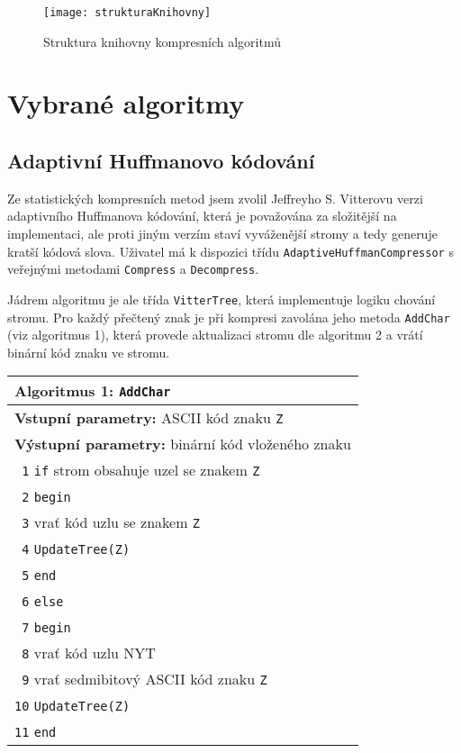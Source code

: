 \begin{figure}[!h]
\centering
\texttt{[image: strukturaKnihovny]}
\caption{Struktura knihovny kompresních algoritmů}
\label{strukturaKnihovny}
\end{figure}


\section{Vybrané algoritmy}
\subsection{Adaptivní Huffmanovo kódování}
Ze statistických kompresních metod jsem zvolil Jeffreyho S. Vitterovu verzi adaptivního Huffmanova kódování, která je považována za složitější na implementaci, ale proti jiným verzím staví vyváženější stromy a tedy generuje kratší kódová slova. Uživatel má k dispozici třídu \texttt{AdaptiveHuffmanCompressor} s veřejnými metodami \texttt{Compress} a \texttt{Decompress}. 

Jádrem algoritmu je ale třída \texttt{VitterTree}, která implementuje logiku chování stromu. Pro každý přečtený znak je při kompresi zavolána jeho metoda \texttt{AddChar} (viz algoritmus 1), která provede aktualizaci stromu dle algoritmu 2 a vrátí binární kód znaku ve stromu.

\begin{table}[!h]
\centering
\begin{tabular}{|l|}
\hline
\textbf{Algoritmus 1:} \texttt{AddChar}\\
\hline
\textbf{Vstupní parametry:} ASCII kód znaku \texttt{Z}\\
\textbf{Výstupní parametry:} binární kód vloženého znaku\\
\hline
\texttt{ 1} \texttt{if} strom obsahuje uzel se znakem \texttt{Z}\\
\texttt{ 2} \texttt{begin}\\
\texttt{ 3} \hspace*{5mm}vrať kód uzlu se znakem \texttt{Z}\\
\texttt{ 4} \hspace*{5mm}\texttt{UpdateTree(\texttt{Z})}\\
\texttt{ 5} \texttt{end}\\
\texttt{ 6} \texttt{else}\\
\texttt{ 7} \texttt{begin}\\
\texttt{ 8} \hspace*{5mm}vrať kód uzlu NYT\\
\texttt{ 9} \hspace*{5mm}vrať sedmibitový ASCII kód znaku \texttt{Z}\\
\texttt{10} \hspace*{5mm}\texttt{UpdateTree(\texttt{Z})}\\
\texttt{11} \texttt{end}\\
\hline
\end{tabular}
\end{table}

